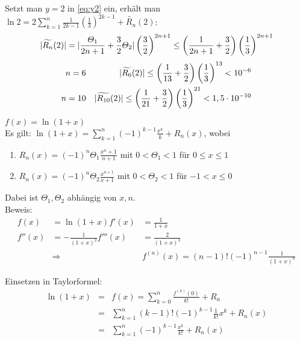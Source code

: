 \documentclass[ngerman,titlepage,twoside, parskip=half*]{scrreprt}
\theoremstyle{break}
\theoremstyle{nonumberbreak}
\DeclarePairedDelimiter{\abs}{\lvert}{\rvert}
\begin{document}
Setzt man $y=2$ in \autoref{eq:y2} ein, erhält man $\ln 2=2\sum_{k=1}^n 
\frac{1}{2k-1}\left( \frac{1}{3} \right)^{2k-1}+\widetilde{R_n}(2)$:
\begin{gather*}\abs{\widetilde{R_n}(2)}=\abs{\frac{\Theta_1}{2n+1}+\frac{3}{2}\Theta_2}
\left( \frac{3}{2} \right)^{2n+1}\leq\left( \frac{1}{2n+1}+\frac{3}{2} \right)
\left( \frac{1}{3} \right)^{2n+1}\end{gather*}
\begin{align*}
  n=6 & & \abs{\widetilde{R_6}(2)}\leq \left( \frac{1}{13}+\frac{3}{2} \right)
  \left( \frac{1}{3} \right)^{13}<10^{-6}\\
  n=10 & & \abs{\widetilde{R_{10}}(2)}\leq \left( \frac{1}{21}+\frac{3}{2} \right)
  \left( \frac{1}{3} \right)^{21}<1,5\cdot 10^{-10}
\end{align*}

$f(x)=\ln(1+x)$\\
Es gilt: $\ln(1+x)=\sum_{k=1}^n (-1)^{k-1}\frac{x^k}{k}+R_n(x)$, wobei
\begin{enumerate}
  \item $R_n(x)=(-1)^n \Theta_1\frac{x^n+1}{n+1}$ mit $0<\Theta_1<1$ für 
    $0\leq x\leq 1$
  \item $R_n(x)=(-1)^n\Theta_2\frac{x^{n+1}}{x+1}$ mit $0<\Theta_2<1$ für
    $-1<x\leq 0$
\end{enumerate}
Dabei ist  $\Theta_1,\Theta_2$ abhängig von $x,n$.\\
Beweis:
\begin{align*}
  f(x)&=\ln(1+x)  f'(x)&=\frac{1}{1+x}\\
  f''(x)&=-\frac{1}{(1+x)^2}  f'''(x)&=\frac{2}{(1+x)^3}\\
  &\Longrightarrow &f^{(n)}(x)=(n-1)!(-1)^{n-1}\frac{1}{(1+x)^n}
\end{align*}

Einsetzen in Taylorformel:
\begin{align*}
  \ln(1+x)&=& f(x)=\sum_{k=0}^n \frac{f^{(k)}(0)}{k!}+R_n\\
  &=& \sum_{k=1}^n (k-1)!(-1)^{k-1}\frac{1}{k!}x^k+R_n(x)\\
  &=& \sum_{k=1}^n (-1)^{k-1}\frac{x^k}{k!}+R_n(x)
\end{align*}
\end{document}
